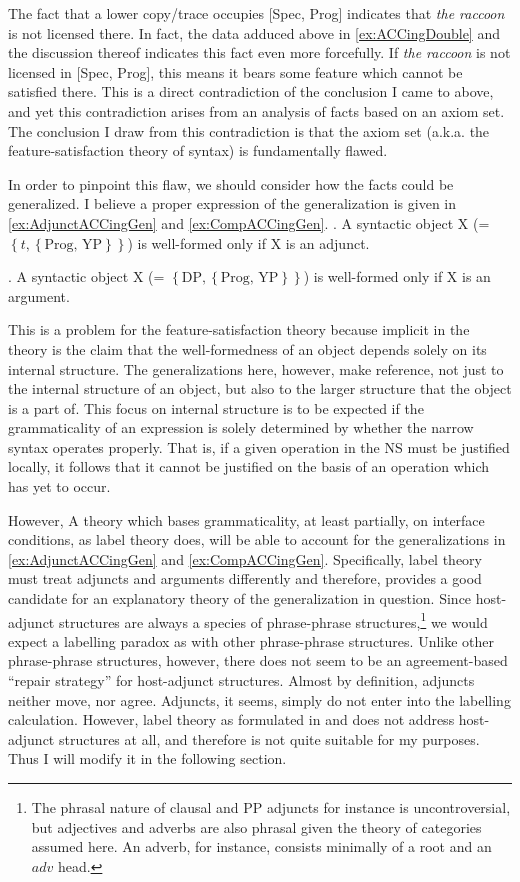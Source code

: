 \documentclass[MilwayThesis]{subfiles}
\begin{document}
The fact that a lower copy/trace occupies [Spec, Prog] indicates that \textit{the raccoon} is not licensed there.
In fact, the data adduced above in \cref{ex:ACCingDouble} and the discussion thereof indicates this fact even more forcefully.
If \textit{the raccoon} is not licensed in [Spec, Prog], this means it bears some feature which cannot be satisfied there.
This is a direct contradiction of the conclusion I came to above, and yet this contradiction arises from an analysis of facts based on an axiom set.
The conclusion I draw from this contradiction is that the axiom set (a.k.a. the feature-satisfaction theory of syntax) is fundamentally flawed.

In order to pinpoint this flaw, we should consider how the facts could be generalized.
I believe a proper expression of the generalization is given in \cref{ex:AdjunctACCingGen} and \cref{ex:CompACCingGen}.
\ex. A syntactic object X (= $\left\{ t, \left\{ \text{Prog, YP}  \right\} \right\}$) is well-formed only if X is an adjunct.\label{ex:AdjunctACCingGen}

\ex. A syntactic object X (= $\left\{ \text{DP}, \left\{ \text{Prog, YP}  \right\} \right\}$) is well-formed only if X is an argument.\label{ex:CompACCingGen}

This is a problem for the feature-satisfaction theory because implicit in the theory is the claim that the well-formedness of an object depends solely on its internal structure.
The generalizations here, however, make reference, not just to the internal structure of an object, but also to the larger structure that the object is a part of.
This focus on internal structure is to be expected if the grammaticality of an expression is solely determined by whether the narrow syntax operates properly.
That is, if a given operation in the NS must be justified locally, it follows that it cannot be justified on the basis of an operation which has yet to occur.

However, A theory which bases grammaticality, at least partially, on interface conditions, as label theory does, will be able to account for the generalizations in \cref{ex:AdjunctACCingGen} and \cref{ex:CompACCingGen}.
Specifically, label theory must treat adjuncts and arguments differently and therefore, provides a good candidate for an explanatory theory of the generalization in question.
Since host-adjunct structures are always a species of phrase-phrase structures,\footnote{
	The phrasal nature of clausal and PP adjuncts for instance is uncontroversial, but adjectives and adverbs are also phrasal given the theory of categories assumed here.
	An adverb, for instance, consists minimally of a root and an $adv$ head.
}
we would expect a labelling paradox as with other phrase-phrase structures.
Unlike other phrase-phrase structures, however, there does not seem to be an agreement-based ``repair strategy'' for host-adjunct structures.
Almost by definition, adjuncts neither move, nor agree. 
Adjuncts, it seems, simply do not enter into the labelling calculation.
However, label theory as formulated in \cite{chomsky2013problems} and \cite{chomsky2015problems} does not address host-adjunct structures at all, and therefore is not quite suitable for my purposes.
Thus I will modify it in the following section.
\end{document}
